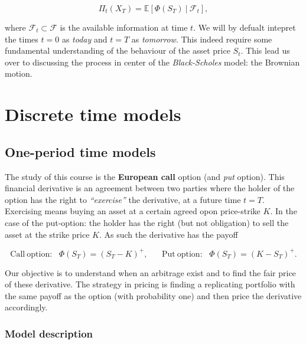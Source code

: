 \documentclass[a4paper,12pt,openany]{book}
\begin{document}
\[
\Pi_t(X_T)=\mathbb{E}\left[\Phi(S_T)\ \vert\ \mathcal{F}_t\right],
\]

where \(\mathcal{F}_t\subset\mathcal{F}\) is the available information at time \(t\). We will by defualt intepret the times \(t=0\) as \emph{today} and \(t=T\) as \emph{tomorrow}. This indeed require some fundamental understanding of the behaviour of the asset price \(S_t\). This lead us over to discussing the process in center of the \emph{Black-Scholes} model: the Brownian motion.

\hypertarget{discrete-time-models}{%
\section{Discrete time models}\label{discrete-time-models}}

\hypertarget{one-period-time-models}{%
\subsection{One-period time models}\label{one-period-time-models}}

The study of this course is the \textbf{European call} option (and \emph{put} option). This financial derivative is an agreement between two parties where the holder of the option has the right to \emph{``exercise''} the derivative, at a future time \(t=T\). Exercising means buying an asset at a certain agreed opon price-strike \(K\). In the case of the put-option: the holder has the right (but not obligation) to sell the asset at the strike price \(K\). As such the derivative has the payoff

\[
\text{Call}\ \text{option:}\hspace{10pt}\Phi(S_T)=(S_T-K)^+,\hspace{20pt}\text{Put}\ \text{option:}\hspace{10pt}\Phi(S_T)=(K-S_T)^+.
\]

Our objective is to understand when an arbitrage exist and to find the fair price of these derivative. The strategy in pricing is finding a replicating portfolio with the same payoff as the option (with probability one) and then price the derivative accordingly.

\hypertarget{model-description}{%
\subsubsection{Model description}\label{model-description}}
\end{document}
